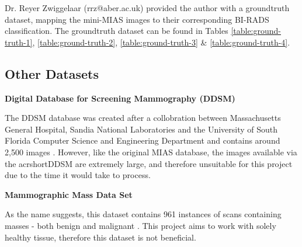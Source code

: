 Dr. Reyer Zwiggelaar (rrz@aber.ac.uk) provided the author with a groundtruth dataset, mapping the mini-\acrshort{MIAS} images to their corresponding BI-RADS classification. The groundtruth dataset can be found in Tables \ref{table:ground-truth-1}, \ref{table:ground-truth-2}, \ref{table:ground-truth-3} \& \ref{table:ground-truth-4}.

\newpage
\subsection{Other Datasets}

\noindent \textbf{Digital Database for Screening Mammography (DDSM)}

The \acrshort{DDSM} database was created after a collobration between Massachusetts General Hospital, Sandia National Laboratories and the University of South Florida Computer Science and Engineering Department and contains around 2,500 images \cite{Heath_Bowyer_Kopans_Moore_Kegelmeyer_Processing} \cite{Heath_Bowyer_Kopans_Kegelmeyer_Moore_Chang_MunishKumaran_1998}.
However, like the original \acrshort{MIAS} database, the images available via the acrshort{DDSM} are extremely large, and therefore unsuitable for this project due to the time it would take to process.

\noindent \textbf{Mammographic Mass Data Set}

As the name suggests, this dataset contains 961 instances of scans containing masses - both benign and malignant \cite{Elter_Schulz-Wendtland_Wittenberg_2007}. This project aims to work with solely healthy tissue, therefore this dataset is not beneficial.
